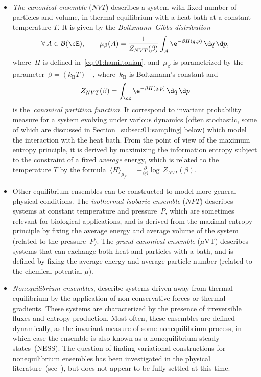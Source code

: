 \begin{itemize}
    \item{\textit{The canonical ensemble} ($NVT$) describes a system with fixed number of particles and volume, in thermal equilibrium with a heat bath at a constant temperature $T$. It is given by the \textit{Boltzmann--Gibbs distribution}
    \begin{equation}
        \label{eq:01:boltzmann_gibbs}
        \forall\,A\in\mathcal B(\cE),\qquad \mu_\beta(A) = \frac{1}{Z_{NVT}(\beta)}\int_{A}\e^{-\beta H(q,p)}\,\d q\,\d p,
    \end{equation}
    where~$H$ is defined in~\eqref{eq:01:hamiltonian}, and~$\mu_\beta$ is parametrized by the parameter~$\beta = (k_{\mathrm{B}}T)^{-1}$, where~$k_{\mathrm{B}}$ is Boltzmann's constant and
    \[
    Z_{NVT}(\beta) = \int_{\cE}\e^{-\beta H(q,p)}\,\d q\,\d p
    \]
    is the~\textit{canonical partition function}.
    It correspond to invariant probability measure for a system evolving under various dynamics (often stochastic, some of which are discussed in Section~\ref{subsec:01:sampling} below) which model the interaction with the heat bath. From the point of view of the maximum entropy principle, it is derived by maximizing the information entropy subject to the constraint of a fixed \textit{average} energy, which is related to the temperature $T$ by the formula~${\langle H\rangle_{\mu_\beta} = -\frac{\partial}{\partial\beta}\log\,Z_{NVT}(\beta)}$. }
    \item{Other equilibrium ensembles can be constructed to model more general physical conditions. The \textit{isothermal-isobaric ensemble} ($NPT$) describes systems at constant temperature and pressure~$P$, which are sometimes relevant for biological applications, and is derived from the maximal entropy principle by fixing the average energy and average volume of the system (related to the pressure~$P$). The \textit{grand-canonical ensemble} ($\mu$VT) describes systems that can exchange both heat and particles with a bath, and is defined by fixing the average energy and average particle number (related to the chemical potential $\mu$).}
    \item{\textit{Nonequilibrium ensembles}, describe systems driven away from thermal equilibrium by the application of non-conservative forces or thermal gradients. These systems are characterized by the presence of irreversible fluxes and entropy production. Most often, these ensembles are defined dynamically, as the invariant measure of some nonequilibrium process, in which case the ensemble is also known as a nonequilibrium steady-states~(NESS). The question of finding variational constructions for nonequilibrium ensembles has been investigated in the physical literature~(see~\cite{J80}), but does not appear to be fully settled at this time.}
\end{itemize}

